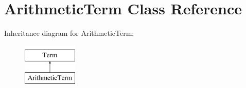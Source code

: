 \hypertarget{classArithmeticTerm}{\section{\-Arithmetic\-Term \-Class \-Reference}
\label{classArithmeticTerm}
}
\-Inheritance diagram for \-Arithmetic\-Term\-:\begin{figure}[H]
\begin{center}
\leavevmode
\includegraphics[height=2.000000cm]{classArithmeticTerm}
\end{center}
\end{figure}
